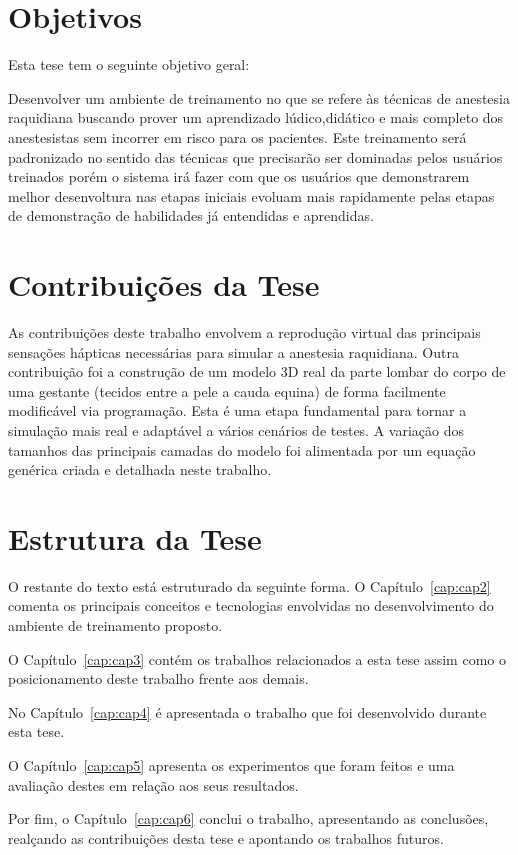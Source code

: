 \section{Objetivos}
\label{sec:objetivos}

Esta tese tem o seguinte objetivo geral:

Desenvolver um ambiente de treinamento no que se refere às técnicas de anestesia raquidiana buscando prover um aprendizado lúdico,didático e mais completo dos anestesistas sem incorrer em risco para os pacientes. Este treinamento será padronizado no sentido das técnicas que precisarão ser dominadas pelos usuários treinados  porém o sistema irá fazer com que os usuários que demonstrarem melhor desenvoltura nas etapas iniciais evoluam mais rapidamente pelas etapas de demonstração de habilidades já entendidas e aprendidas. 

\section{Contribuições da Tese}
\label{sec:contribuicoes}

As contribuições deste trabalho envolvem a reprodução virtual das principais sensações hápticas necessárias para simular a anestesia raquidiana. Outra contribuição foi a construção de um modelo 3D real da parte lombar do corpo de uma gestante (tecidos entre a pele a cauda equina) de forma facilmente modificável via programação. Esta é uma etapa fundamental para tornar a simulação mais real e adaptável a vários cenários de testes. A variação dos tamanhos das principais camadas do modelo foi alimentada por um equação genérica criada e detalhada neste trabalho.

\section{Estrutura da Tese}
\label{sec:estrutura}

O restante do texto está estruturado da seguinte forma. O Capítulo~\ref{cap:cap2} comenta os principais conceitos e tecnologias envolvidas no desenvolvimento do ambiente de treinamento proposto.

O Capítulo~\ref{cap:cap3} contém os trabalhos relacionados a esta tese assim como o posicionamento deste trabalho frente aos demais.

No Capítulo~\ref{cap:cap4} é apresentada o trabalho que foi desenvolvido durante esta tese. 

O Capítulo~\ref{cap:cap5} apresenta os experimentos que foram feitos e uma avaliação destes em relação aos seus resultados.

Por fim, o Capítulo~\ref{cap:cap6} conclui o trabalho, apresentando as conclusões, realçando as contribuições desta tese e apontando os  trabalhos futuros.


